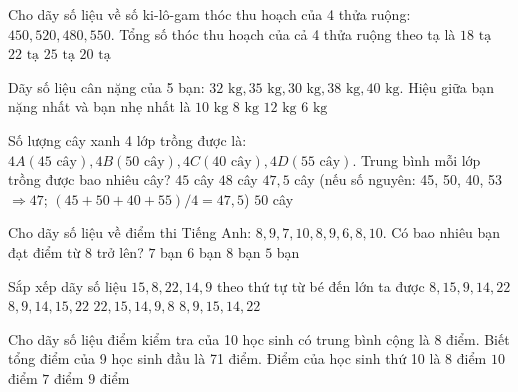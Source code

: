 \begin{ex} %
Cho dãy số liệu về số ki-lô-gam thóc thu hoạch của 4 thửa ruộng: $450, 520, 480, 550$. Tổng số thóc thu hoạch của cả 4 thửa ruộng theo tạ là
\choice
{$18\text{ tạ}$}
{$22\text{ tạ}$}
{$25\text{ tạ}$}
{\True $20\text{ tạ}$}
\end{ex}

\begin{ex} %
Dãy số liệu cân nặng của 5 bạn: $32\text{ kg}, 35\text{ kg}, 30\text{ kg}, 38\text{ kg}, 40\text{ kg}$. Hiệu giữa bạn nặng nhất và bạn nhẹ nhất là
\choice
{\True $10\text{ kg}$}
{$8\text{ kg}$}
{$12\text{ kg}$}
{$6\text{ kg}$}
\end{ex}

\begin{ex} %
Số lượng cây xanh 4 lớp trồng được là: $4A (45\text{ cây}), 4B (50\text{ cây}), 4C (40\text{ cây}), 4D (55\text{ cây})$. Trung bình mỗi lớp trồng được bao nhiêu cây?
\choice
{$45$ cây}
{$48$ cây}
{\True $47{,}5$ cây (nếu số nguyên: 45, 50, 40, 53 $\Rightarrow 47$; $(45+50+40+55)/4 = 47{,}5$)}
{$50$ cây}
\end{ex}

\begin{ex} %
Cho dãy số liệu về điểm thi Tiếng Anh: $8, 9, 7, 10, 8, 9, 6, 8, 10$. Có bao nhiêu bạn đạt điểm từ 8 trở lên?
\choice
{\True $7$ bạn}
{$6$ bạn}
{$8$ bạn}
{$5$ bạn}
\end{ex}

\begin{ex} %
Sắp xếp dãy số liệu $15, 8, 22, 14, 9$ theo thứ tự từ bé đến lớn ta được
\choice
{$8, 15, 9, 14, 22$}
{\True $8, 9, 14, 15, 22$}
{$22, 15, 14, 9, 8$}
{$8, 9, 15, 14, 22$}
\end{ex}

\begin{ex} %
Cho dãy số liệu điểm kiểm tra của 10 học sinh có trung bình cộng là 8 điểm. Biết tổng điểm của 9 học sinh đầu là 71 điểm. Điểm của học sinh thứ 10 là
\choice
{$8$ điểm}
{$10$ điểm}
{$7$ điểm}
{\True $9$ điểm}
\end{ex}

